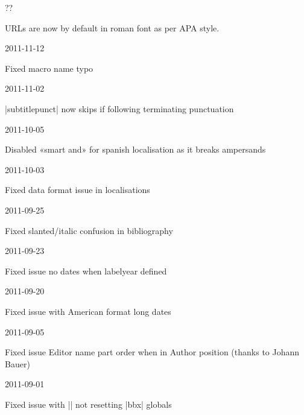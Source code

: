 \documentclass{ltxdockit}
\begin{document}
\begin{changelog}

\begin{release}{4.3}{??}
\item URLs are now by default in roman font as per APA style.
\end{release}

\begin{release}{4.2}{2011-11-12}
\item Fixed macro name typo
\end{release}

\begin{release}{4.1}{2011-11-02}
\item |subtitlepunct| now skips if following terminating punctuation
\end{release}

\begin{release}{4.0}{2011-10-05}
\item Disabled «smart and» for spanish localisation as it breaks ampersands
\end{release}

\begin{release}{3.9}{2011-10-03}
\item Fixed data format issue in localisations
\end{release}

\begin{release}{3.8}{2011-09-25}
\item Fixed slanted/italic confusion in bibliography
\end{release}

\begin{release}{3.7}{2011-09-23}
\item Fixed issue no dates when labelyear defined
\end{release}

\begin{release}{3.6}{2011-09-20}
\item Fixed issue with American format long dates
\end{release}

\begin{release}{3.5}{2011-09-05}
\item Fixed issue Editor name part order when in Author position (thanks to
  Johann Bauer)
\end{release}

\begin{release}{3.4}{2011-09-01}
\item Fixed issue with |\fullcite| not resetting |bbx| globals
\end{release}


\end{changelog}
\end{document}
